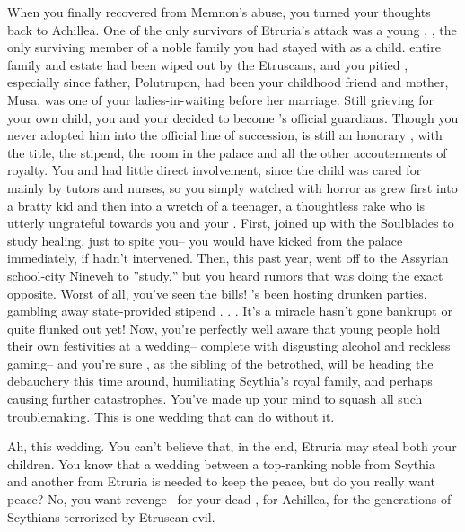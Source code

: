 \documentclass[char]{Kos}
\begin{document}
When you finally recovered from Memnon's abuse, you turned your thoughts back to Achillea. One of the only survivors of Etruria's attack was a young \cWard{\kid}, \cWard{}, the only surviving member of a noble family you had stayed with as a child. \cWard{\Their} entire family and estate had been wiped out by the Etruscans, and you pitied \cWard{\them}, especially since \cWard{\their} father, Polutrupon, had been your childhood friend and \cWard{\their} mother, Musa, was one of your ladies-in-waiting before her marriage.  Still grieving for your own child, you and your \cScythiaKing{\spouse} decided to become \cWard{}'s official guardians. Though you never adopted him into the official line of succession, \cWard{\they} is still an honorary \cWard{\prince}, with the title, the stipend, the room in the palace and all the other accouterments of royalty. You and \cScythiaKing{} had little direct involvement, since the child was cared for mainly by tutors and nurses, so you simply watched with horror as \cWard{} grew first into a bratty kid and then into a wretch of a teenager, a thoughtless rake who is utterly ungrateful towards you and your \cScythiaKing{\spouse}. First, \cWard{\they} joined up with the Soulblades to study healing, just to spite you-- you would have kicked \cWard{\them} from the palace immediately, if \cScythiaKing{} hadn't intervened. Then, this past year, \cWard{\they} went off to the Assyrian school-city Nineveh to ''study,'' but you heard rumors that \cWard{\they} was doing the exact opposite. Worst of all, you've seen the bills! \cWard{\They}'s been hosting drunken parties, gambling away \cWard{\their} state-provided stipend . . . It's a miracle \cWard{\they} hasn't gone bankrupt or quite flunked out yet! Now, you're perfectly well aware that young people hold their own festivities at a wedding-- complete with disgusting alcohol and reckless gaming-- and you're sure \cWard{}, as the sibling of the betrothed, will be heading the debauchery this time around, humiliating Scythia's royal family, and perhaps causing further catastrophes. You've made up your mind to squash all such troublemaking. This is one wedding that can do without it.

Ah, this wedding. You can't believe that, in the end, Etruria may steal both your children. You know that a wedding between a top-ranking noble from Scythia and another from Etruria is needed to keep the peace, but do you really want peace? No, you want revenge-- for your dead \cFugitive{\offspring}, for Achillea, for the generations of Scythians terrorized by Etruscan evil. 
\end{document}

